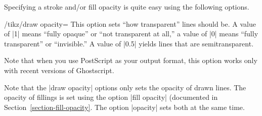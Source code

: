 Specifying a stroke and/or fill opacity is quite easy using the
following options.


\begin{key}{/tikz/draw opacity=}
  This option sets ``how transparent'' lines should be. A value of |1|
  means ``fully opaque'' or ``not transparent at all,'' a value of |0|
  means ``fully transparent'' or ``invisible.'' A value of |0.5|
  yields lines that are semitransparent.

  Note that when you use PostScript as your output format,
  this option works only with recent versions of Ghostscript.

\begin{codeexample}[]
\end{codeexample}
\end{key}

Note that the |draw opacity| options only sets the opacity of drawn
lines. The opacity of fillings is set using the option
|fill opacity| (documented in Section~\ref{section-fill-opacity}. The
option |opacity| sets both at the same time.

